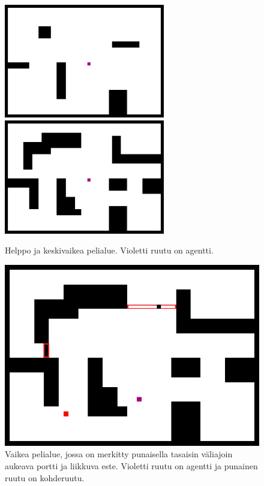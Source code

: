 \documentclass[utf8]{gradu3}
\begin{document}
\begin{figure}[h]
\includegraphics[width=7cm]{area_beginner.png}
\includegraphics[width=7cm]{area_intermediate.png}
\centering
\caption{Helppo ja keskivaikea pelialue. Violetti ruutu on agentti.}
\label{areabeginnerintermediate}
\end{figure}

\begin{figure}[h]
\includegraphics[width=13cm]{area_difficult.png}
\centering
\caption{Vaikea pelialue, jossa on merkitty punaisella tasaisin väliajoin aukeava portti ja liikkuva este. Violetti ruutu on agentti ja punainen ruutu on kohderuutu.}
\label{areadifficult}
\end{figure}
\end{document}
